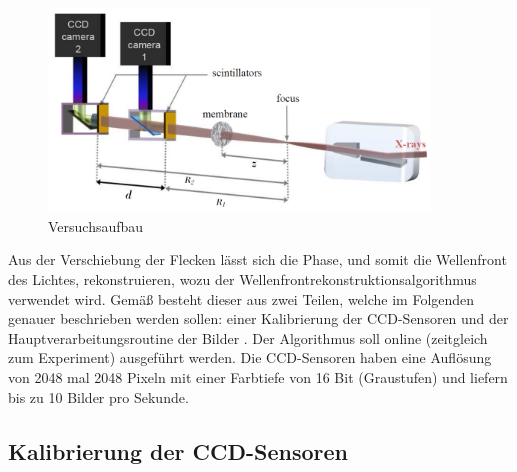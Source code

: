 \begin{figure}[htbp]
	\begin{center}
		\includegraphics[width=0.9\textwidth]{img/Versuchsaufbau}
		\caption[Versuchsaufbau]{Versuchsaufbau }
		\label{fig:versuch}
	\end{center}
\end{figure}

Aus der Verschiebung der Flecken lässt sich die Phase, und somit die Wellenfront des Lichtes, rekonstruieren, wozu der Wellenfrontrekonstruktionsalgorithmus verwendet wird. Gemäß \citeauthor{Ber13} besteht dieser aus zwei Teilen, welche im Folgenden genauer beschrieben werden sollen: einer Kalibrierung der \gls{CCD}-Sensoren und der Hauptverarbeitungsroutine der Bilder . Der Algorithmus soll online (zeitgleich zum Experiment) ausgeführt werden. Die \gls{CCD}-Sensoren haben eine Auflösung von 2048 mal 2048 Pixeln mit einer Farbtiefe von 16 Bit (Graustufen) und liefern bis zu 10 Bilder pro Sekunde.

\subsection{Kalibrierung der CCD-Sensoren}

